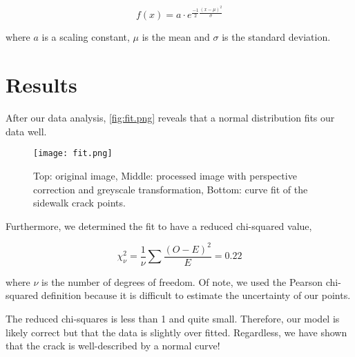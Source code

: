 \documentclass{article}
\begin{document}
\begin{equation}
    f(x) = a \cdot e^{\frac{-1}{2}\frac{(x-\mu)^2}{\sigma}}
\end{equation}

where $a$ is a scaling constant, $\mu$ is the mean and $\sigma$ is the standard deviation.

\section{Results}

After our data analysis, \autoref{fig:fit.png} reveals that a normal distribution fits our data well.

\begin{figure}[H]
    \centering
    \texttt{[image: fit.png]}
    \caption{Top: original image, Middle: processed image with perspective correction and greyscale transformation,
Bottom: curve fit of the sidewalk crack points.}
    \label{fig:fit.png}
\end{figure}

Furthermore, we determined the fit to have a reduced chi-squared value,

\begin{equation}
    \chi_{\nu}^2 = \frac{1}{\nu} \sum \frac{(O-E)^2}{E} = 0.22
\end{equation}

where $\nu$ is the number of degrees of freedom. Of note, we used the Pearson chi-squared definition because it
is difficult to estimate the uncertainty of our points.

The reduced chi-squares is less than 1 and quite small. Therefore, our model is likely correct but that the
data is slightly over fitted. Regardless, we have shown that the crack is well-described by a normal curve!



\nocite{*}
\end{document}
